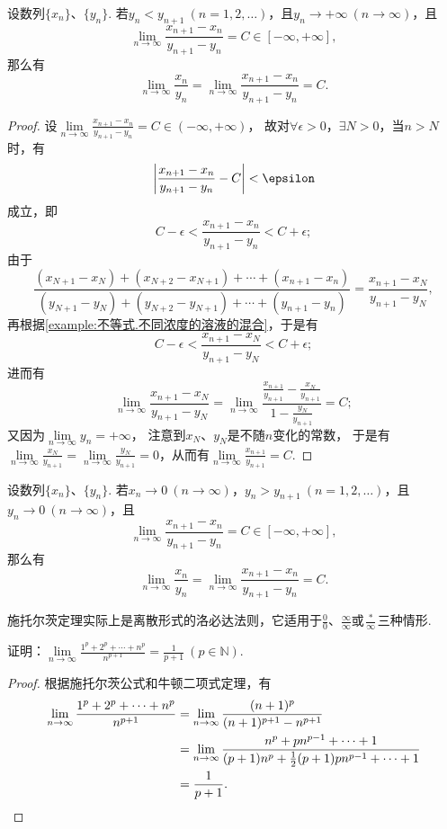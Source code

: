 \begin{theorem}[施托尔茨定理I]\label{theorem:极限.施托尔茨定理1}
设数列\(\{x_n\}\)、\(\{y_n\}\).
若\(y_n < y_{n+1}\ (n=1,2,\dotsc)\)，且\(y_n \to +\infty\ (n\to\infty)\)，且\[
\lim\limits_{n\to\infty} \frac{x_{n+1}-x_n}{y_{n+1}-y_n} = C\in[-\infty,+\infty],
\]那么有\[
\lim\limits_{n\to\infty} \frac{x_n}{y_n}
= \lim\limits_{n\to\infty} \frac{x_{n+1}-x_n}{y_{n+1}-y_n}
= C.
\]
\begin{proof}%
设\(\lim\limits_{n\to\infty} \frac{x_{n+1}-x_n}{y_{n+1}-y_n} = C\in(-\infty,+\infty)\)，
故对\(\forall\epsilon>0\)，\(\exists N>0\)，当\(n > N\)时，有\[
\abs{\frac{x_{n+1}-x_n}{y_{n+1}-y_n} - C} < \epsilon
\]成立，即\[
C - \epsilon < \frac{x_{n+1}-x_n}{y_{n+1}-y_n} < C + \epsilon;
\]
由于\[
\frac{
(x_{N+1}-x_N)
+ (x_{N+2}-x_{N+1})
+ \dotsb
+ (x_{n+1}-x_n)
}{
(y_{N+1}-y_N)
+ (y_{N+2}-y_{N+1})
+ \dotsb
+ (y_{n+1}-y_n)
}
= \frac{x_{n+1}-x_N}{y_{n+1}-y_N},
\]再根据\cref{example:不等式.不同浓度的溶液的混合}，于是有\[
C - \epsilon <
\frac{x_{n+1}-x_N}{y_{n+1}-y_N}
< C + \epsilon;
\]进而有\[
\lim\limits_{n\to\infty} \frac{x_{n+1}-x_N}{y_{n+1}-y_N}
= \lim\limits_{n\to\infty} \frac{\frac{x_{n+1}}{y_{n+1}}-\frac{x_N}{y_{n+1}}}{1-\frac{y_N}{y_{n+1}}}
= C;
\]又因为\(\lim\limits_{n\to\infty} y_n = +\infty\)，
注意到\(x_N\)、\(y_N\)是不随\(n\)变化的常数，
于是有\(\lim\limits_{n\to\infty} \frac{x_N}{y_{n+1}}
= \lim\limits_{n\to\infty} \frac{y_N}{y_{n+1}}
= 0\)，从而有\(\lim\limits_{n\to\infty} \frac{x_{n+1}}{y_{n+1}} = C\).
\end{proof}
\end{theorem}

\begin{theorem}[施托尔茨定理II]\label{theorem:极限.施托尔茨定理2}
设数列\(\{x_n\}\)、\(\{y_n\}\).
若\(x_n\to0\ (n\to\infty)\)，\(y_n > y_{n+1}\ (n=1,2,\dotsc)\)，且\(y_n\to0\ (n\to\infty)\)，且\[
\lim\limits_{n\to\infty} \frac{x_{n+1}-x_n}{y_{n+1}-y_n} = C\in[-\infty,+\infty],
\]那么有\[
\lim\limits_{n\to\infty} \frac{x_n}{y_n}
= \lim\limits_{n\to\infty} \frac{x_{n+1}-x_n}{y_{n+1}-y_n}
= C.
\]
\end{theorem}

施托尔茨定理实际上是离散形式的洛必达法则，它适用于\(\frac{0}{0}\)、\(\frac{\infty}{\infty}\)或\(\frac{*}{\infty}\)三种情形.

\begin{example}\label{example:极限.解极限常用公式方法.例1}
证明：\(\lim\limits_{n\to\infty} \frac{1^p+2^p+\dotsb+n^p}{n^{p+1}}
= \frac{1}{p+1}\ (p\in\mathbb{N})\).
\begin{proof}
根据施托尔茨公式和牛顿二项式定理，有\begin{align*}
	\lim\limits_{n\to\infty} \frac{1^p+2^p+\dotsb+n^p}{n^{p+1}}
	&= \lim\limits_{n\to\infty} \frac{(n+1)^p}{(n+1)^{p+1} - n^{p+1}} \\
	&= \lim\limits_{n\to\infty} \frac{n^p + p n^{p-1} + \dotsb + 1}
		{(p+1) n^p + \frac{1}{2} (p+1) p n^{p-1} + \dotsb + 1} \\
	&= \frac{1}{p+1}.
	\qedhere
\end{align*}
\end{proof}
\end{example}

